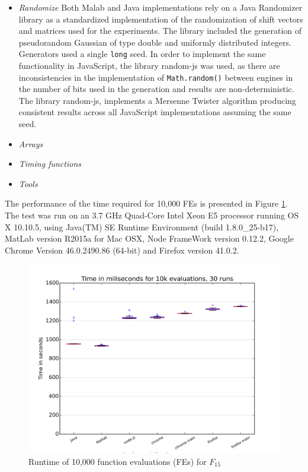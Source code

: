 \documentclass[journal,onecolumn]{IEEEtran}
\begin{document}
\begin{itemize}
\item {\em Randomize} Both Malab and Java implementations rely on a 
Java Randomizer library as a standardized implementation of the 
randomization of shift vectors and matrices used for the experiments.
The library included the generation of pseudorandom Gaussian of type
double and uniformly distributed integers. Generators used a single
{\tt long} seed. In order to implement the same functionality in
JavaScript, the library random-js was used, as there are inconsistencies 
in the implementation of {\tt Math.random()} between engines in the
number of bits used in the generation and results are non-deterministic. 
The library random-js, implements a Mersenne Twister algorithm producing 
consistent results across all JavaScript implementations assuming the same seed.
\item {\em Arrays} 
\item {\em Timing functions}
\item {\em Tools} 
\end{itemize}

The performance of the time required for 10,000 FEs is presented in Figure \ref{fig:f15_times}.
The test was run on an 3.7 GHz Quad-Core Intel Xeon E5 processor running OS X 10.10.5, 
using Java(TM) SE Runtime Environment (build 1.8.0\_25-b17), 
MatLab version R2015a for Mac OSX, Node FrameWork version 0.12.2, Google Chrome Version 46.0.2490.86 (64-bit) 
and Firefox version 41.0.2.  

\begin{figure}[!htb]
\centering
\includegraphics[width=0.9\linewidth]{f15_times.png}
\caption{ Runtime of 10,000 function evaluations (FEs) for $F_{15}$} 
\label{fig:f15_times}
\end{figure}
\end{document}
